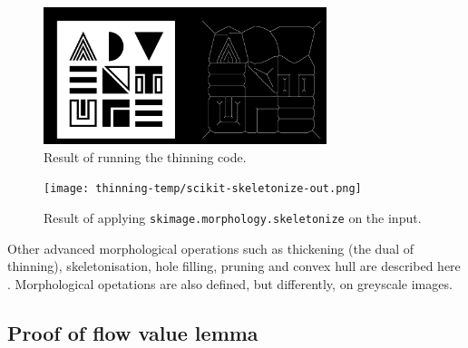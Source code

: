 \documentclass[a4paper]{article}
\begin{document}
\begin{figure}[H]
    \centering
    \includegraphics[height=4cm]{img/thinning-temp/thin_input_result.PNG}
    \caption{Result of running the thinning code.}
\end{figure}
\begin{figure}[H]
    \centering
    \texttt{[image: thinning-temp/scikit-skeletonize-out.png]}
    \caption{Result of applying \texttt{skimage.morphology.skeletonize} on the input.}
\end{figure}
Other advanced morphological operations such as thickening (the dual of thinning), skeletonisation, hole filling, pruning and convex hull are described here \TODO[refs]. Morphological opetations are also defined, but differently, on greyscale images. 



\newpage
\subsection{Proof of flow value lemma}
\label{app:flow_value_lemma_proof}
\end{document}
